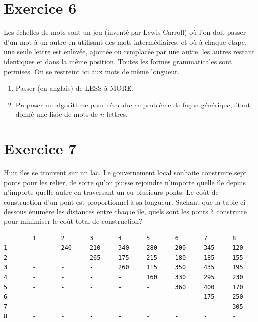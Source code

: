 \documentclass[a4paper,10pt]{article}
\begin{document}
\section*{Exercice 6}

Les échelles de mots sont un jeu (inventé par Lewis Carroll) où l’on doit
passer d’un mot à un autre en utilisant des mots intermédiaires, et où à chaque étape, une
seule lettre est enlevée, ajoutée ou remplacée par une autre, les autres restant identiques
et dans la même position. Toutes les formes grammaticales sont permises. On se restreint
ici aux mots de même longueur.

\begin{enumerate}
\item Passer (en anglais) de LESS à MORE.
\item Proposer un algorithme pour résoudre ce problème de façon générique, étant donné
une liste de mots de $n$ lettres.
\end{enumerate}

\section*{Exercice 7}

Huit îles se trouvent sur un lac. Le gouvernement local souhaite construire
sept ponts pour les relier, de sorte qu'on puisse rejoindre n'importe quelle
île depuis n'importe quelle autre en traversant un ou plusieurs ponts. Le
coût de construction d'un pont est proportionnel à sa longueur. Sachant
que la table ci-dessous énumère les distances entre chaque île, quels sont les
ponts à construire pour minimiser le coût total de construction?

\begin{verbatim}
        1       2       3       4       5       6       7       8
1       -       240     210     340     280     200     345     120
2       -       -       265     175     215     180     185     155
3       -       -       -       260     115     350     435     195
4       -       -       -       -       160     330     295     230
5       -       -       -       -       -       360     400     170
6       -       -       -       -       -       -       175     250
7       -       -       -       -       -       -       -       305
8       -       -       -       -       -       -       -       -
\end{verbatim}
\end{document}
